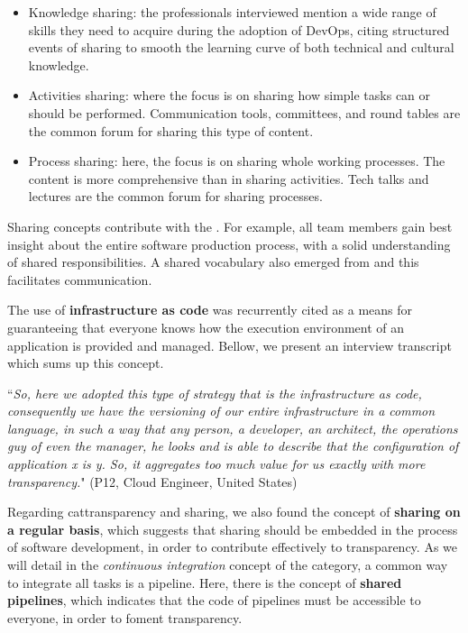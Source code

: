 \begin{itemize}
\item Knowledge sharing: the professionals interviewed mention a wide range of
skills they need to acquire during the adoption of DevOps, citing
structured events of sharing to smooth the learning curve of both technical and
cultural knowledge.


\item Activities sharing: where the focus is on sharing how simple tasks can or
should be performed. Communication tools, committees, and round tables are the common
forum for sharing this type of content.

\item Process sharing: here, the focus is on sharing whole working processes. The
content is more comprehensive than in sharing activities. Tech talks and
lectures are the common forum for sharing processes.

\end{itemize}

Sharing concepts contribute with the . For example,
all team members gain best insight about the entire software production
process, with a solid understanding of shared responsibilities. A shared vocabulary also
emerged from  and this facilitates communication.

The use of \textbf{infrastructure as code} was
recurrently cited as a means for guaranteeing that everyone knows how the execution environment of
an application is provided and managed. Bellow, we present an interview
transcript which sums up this concept.

\begin{mq}
``\emph{So, here we adopted this type of strategy that is the infrastructure as code,
consequently we have the versioning of our entire infrastructure in a common
language, in such a way that any person, a developer, an architect, the
operations guy of even the manager, he looks and is able to describe that the
configuration of application x is y. So, it aggregates too much value for us
exactly with more transparency.}" (P12, Cloud Engineer, United States)
\end{mq}

Regarding cat{transparency and sharing}, we also found the concept of \textbf{sharing on a regular basis}, which suggests
that sharing should be embedded in the process of software
development, in order to contribute effectively to transparency.
As we will detail in the \emph{continuous integration} concept of
the  category, a common way to integrate all tasks is a pipeline. Here, there is the
concept of \textbf{shared pipelines}, which indicates that the code of pipelines
must be accessible to everyone, in order to foment transparency.

